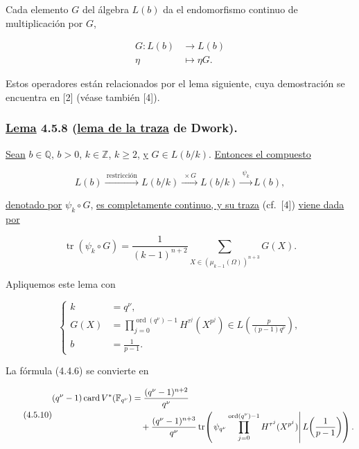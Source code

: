 Cada elemento $G$ del álgebra $L(b)$ da el endomorfismo continuo de
multiplicación por $G$,

\begin{equation}\tag{4.5.7}
\begin{aligned}
G:L(b)&\longrightarrow L(b)\\
\eta&\longmapsto\eta G.
\end{aligned}
\end{equation}

Estos operadores están relacionados por el lema siguiente, cuya
demostración se encuentra en [2] (véase también [4]).

\pageoriginale

\subsubsection*{\underline{Lema} 4.5.8 (\underline{lema de la traza} de Dwork).}
\underline{Sean} $b\in\mathbb Q$, $b>0$, $k\in\mathbb Z$, $k\geq2$, \underline{y}
$G\in L(b/k)$. \underline{Entonces el compuesto}

\[
L(b)\xrightarrow{\ \text{restricción}\ }L(b/k)
\xrightarrow{\ \times G\ }L(b/k)
\xrightarrow{\ \psi_k\ }L(b),
\]

\underline{denotado por} $\psi_k\circ G$, \underline{es completamente continuo, y su traza}
(cf.~[4]) \underline{viene dada por}

\begin{equation}\tag{4.5.9}
\operatorname{tr}(\psi_k\circ G)
=\frac1{(k-1)^{n+2}}
\sum_{X\in(\mu_{k-1}(\Omega))^{n+3}}G(X).
\end{equation}

Apliquemos este lema con

\[
\left\{
\begin{aligned}
k&=q^\nu,\\
G(X)&=\prod_{j=0}^{\operatorname{ord}(q^\nu)-1}
H^{\tau^j}(X^{p^j})
\in L\!\left(\frac{p}{(p-1)q^\nu}\right),\\
b&=\frac1{p-1}.
\end{aligned}
\right.
\]

La fórmula (4.4.6) se convierte en

{\small\begin{equation}\tag{4.5.10}
\begin{aligned}
(q^\nu-1)\operatorname{card}V^*(\mathbb F_{q^\nu})
&=\frac{(q^\nu-1)^{n+2}}{q^\nu}\\
&\quad+\frac{(\sisi{q}{q^\nu}-1)^{n+3}}{q^\nu}
\operatorname{tr}\!\left(
\left.\psi_{\sisi{q}{q^\nu}}
\prod_{j=0}^{\operatorname{ord}(q^\nu)-1}H^{\tau^j}(X^{p^j})
\right|L\!\left(\frac1{p-1}\right)\right).
\end{aligned}
\end{equation}}

